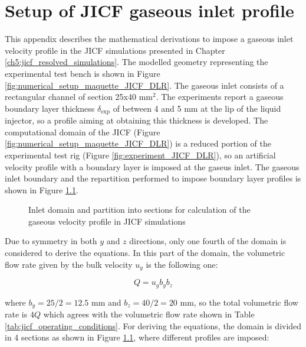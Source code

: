 \chapter{Setup of JICF gaseous inlet profile}
\label{app:JICF_BL_setup}

This appendix describes the mathematical derivations to impose a gaseous inlet velocity profile in the JICF simulations presented in Chapter \ref{ch5:jicf_resolved_simulations}. The modelled geometry representing the experimental test bench is shown in Figure \ref{fig:numerical_setup_maquette_JICF_DLR}. The gaseous inlet consists of a rectangular channel of section 25x40 mm$^2$. The experiments  report a gaseous boundary layer thickness $\delta_\mathrm{exp}$ of between 4 and 5 mm at the lip of the liquid injector, so a profile aiming at obtaining this thickness is developed. The computational domain of the JICF (Figure \ref{fig:numerical_setup_maquette_JICF_DLR}) is a reduced portion of the experimental test rig (Figure \ref{fig:experiment_JICF_DLR}), so an artificial velocity profile with a boundary layer is imposed at the gaseus inlet. The gaseous inlet boundary and the repartition performed to impose boundary layer profiles is shown in Figure \ref{fig:domain_partition_3D_profile}.


\begin{figure}[h!]	
	\centering
%	
	\caption{Inlet domain and partition into sections for calculation of the gaseous velocity profile in JICF simulations}
	\label{fig:domain_partition_3D_profile}
\end{figure}



Due to symmetry in both $y$ and $z$ directions, only one fourth of the domain is considered to derive the equations. In this part of the domain, the volumetric flow rate given by the bulk velocity $u_g$ is the following one:

\begin{equation}
\label{eq:volumetric_flow_rate_2D}
Q = u_g b_y b_z
\end{equation}	

where $b_y = 25/2 = 12.5$ mm and $b_z = 40/2 = 20$ mm, so the total volumetric flow rate is $4Q$ which agrees with the volumetric flow rate shown in Table \ref{tab:jicf_operating_conditions}. For deriving the equations, the domain is divided in 4 sections as shown in Figure \ref{fig:domain_partition_3D_profile}, where different profiles are imposed:

